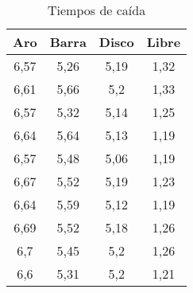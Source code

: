 \documentclass[a4paper]{article}
\begin{document}
\begin{table}[H]
    \centering
    \begin{tabular}{|c|c|c|c|}
    \hline
        Aro & Barra & Disco & Libre  \\ \hline
        6,57 & 5,26 & 5,19 & 1,32  \\ \hline
        6,61 & 5,66 & 5,2 & 1,33  \\ \hline
        6,57 & 5,32 & 5,14 & 1,25  \\ \hline
        6,64 & 5,64 & 5,13 & 1,19  \\ \hline
        6,57 & 5,48 & 5,06 & 1,19  \\ \hline
        6,67 & 5,52 & 5,19 & 1,23  \\ \hline
        6,64 & 5,59 & 5,12 & 1,19  \\ \hline
        6,69 & 5,52 & 5,18 & 1,26  \\ \hline
        6,7 & 5,45 & 5,2 & 1,26  \\ \hline
        6,6 & 5,31 & 5,2 & 1,21  \\ \hline
    \end{tabular}
    \caption{Tiempos de caída}
\end{table}
\end{document}
